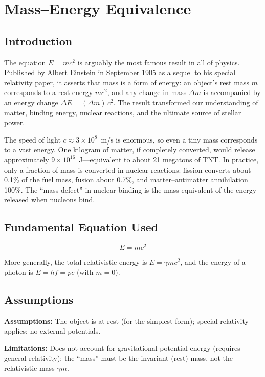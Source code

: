 \chapter{Mass--Energy Equivalence}

\section*{Introduction}

The equation $E = mc^{2}$ is arguably the most famous result in all of physics. Published by Albert Einstein in September 1905 as a sequel to his special relativity paper, it asserts that mass is a form of energy: an object's rest mass $m$ corresponds to a rest energy $mc^{2}$, and any change in mass $\Delta m$ is accompanied by an energy change $\Delta E = (\Delta m)\,c^{2}$. The result transformed our understanding of matter, binding energy, nuclear reactions, and the ultimate source of stellar power.

The speed of light $c \approx 3 \times 10^{8}$~m/s is enormous, so even a tiny mass corresponds to a vast energy. One kilogram of matter, if completely converted, would release approximately $9 \times 10^{16}$~J---equivalent to about 21 megatons of TNT. In practice, only a fraction of mass is converted in nuclear reactions: fission converts about 0.1\% of the fuel mass, fusion about 0.7\%, and matter--antimatter annihilation 100\%. The ``mass defect'' in nuclear binding is the mass equivalent of the energy released when nucleons bind.
\section*{Fundamental Equation Used}

\begin{equation}
\boxed{\; E = mc^{2}\;}
\label{eq:mass-energy-einstein}
\end{equation}

More generally, the total relativistic energy is $E = \gamma mc^{2}$, and the energy of a photon is $E = hf = pc$ (with $m = 0$).
\section*{Assumptions}

\textbf{Assumptions:} The object is at rest (for the simplest form); special relativity applies; no external potentials.


\textbf{Limitations:} Does not account for gravitational potential energy (requires general relativity); the ``mass'' must be the invariant (rest) mass, not the relativistic mass $\gamma m$.


